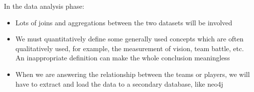 \documentclass{article}
\begin{document}
In the data analysis phase:

\begin{itemize}
	\item Lots of joins and aggregations between the two datasets will be involved
	\item We must quantitatively define some generally used concepts which are often qualitatively used, for example, the measurement of vision, team battle, etc. An inappropriate definition can make the whole conclusion meaningless
	\item When we are answering the relationship between the teams or players, we will have to extract and load the data to a secondary database, like neo4j
\end{itemize}

\printglossary

\end{document}
